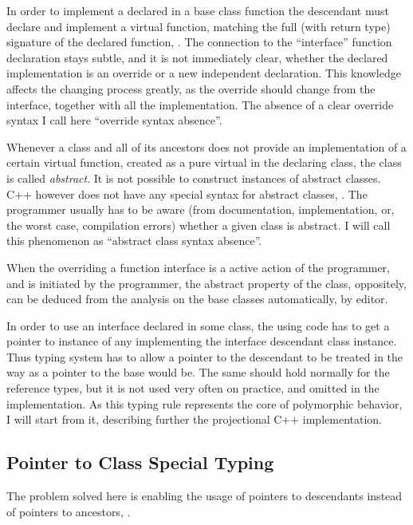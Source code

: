 In order to implement a declared in a base class function the descendant must declare and implement
a virtual function, matching the full (with return type) signature of the declared function, . The connection 
to the ``interface'' function declaration stays subtle, and it is not immediately clear, whether the 
declared implementation is an override or a new independent declaration. This knowledge affects the 
changing process greatly, as the override should change from the interface, together with all the implementation.
The absence of a clear override syntax I call here ``override syntax absence''.

Whenever a class and all of its ancestors does not provide an implementation of a certain virtual function,
created as a pure virtual in the declaring class, the class is called \emph{abstract}. It is not possible
to construct instances of abstract classes. C++ however does not have any special syntax for abstract classes,  .
The programmer usually has to be aware (from documentation, implementation, or, the worst case, compilation
errors) whether a given class is abstract. I will call this phenomenon as ``abstract class syntax absence''.

When the overriding a function interface is a active action of the programmer, and is initiated by the 
programmer, the abstract property of the class, oppositely, can be deduced from the analysis on 
the base classes automatically, by editor.

In order to use an interface declared in some class, the using code has to get a pointer to instance
of any implementing the interface descendant class instance. Thus typing system has to allow a pointer
to the descendant to be treated in the way as a pointer to the base would be. The same should hold 
normally for the reference types, but it is not used very often on practice, and omitted in the implementation.
As this typing rule represents the core of polymorphic behavior, I will start from it, describing further the
projectional C++ implementation.

\subsection{Pointer to Class Special Typing}

The problem solved here is enabling the usage of pointers to descendants instead of pointers to ancestors,
.


